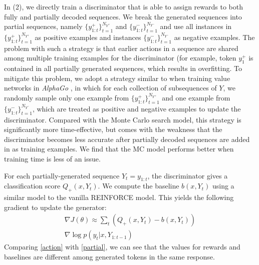 \documentclass[11pt]{article}
\begin{document}
In (2), we directly train a discriminator that is able to assign rewards to both fully and partially decoded sequences. 
We break 
the generated sequences into partial sequences, namely 
$\{y^+_{1:t}\}_{t=1}^{N_{Y^+}}$ and $\{y^-_{1:t}\}_{t=1}^{N_{Y^-}}$
 and use 
 all instances in  $\{y^+_{1:t}\}_{t=1}^{N_{Y^+}}$ as positive examples and  instances  $\{y^-_{1:t}\}_{t=1}^{N_{Y^-}}$ as negative examples. 
The problem with such a strategy is that earlier actions in a sequence are 
shared among multiple training examples for
 the discriminator 
(for example, token $y^+_1$ is contained in all partially generated sequences, which results in overfitting. 
To mitigate this problem, 
we adopt a  strategy similar to when training value networks in  {\it AlphaGo} \cite{silver2016mastering}, in which 
for each collection of subsequences of $Y$, we randomly sample only one example from $\{y^+_{1:t}\}_{t=1}^{N_{Y^+}}$ and one example from $\{y^-_{1:t}\}_{t=1}^{N_{Y^-}}$, which are treated as positive and negative examples
to update the discriminator. 
Compared with the Monte Carlo search model, this strategy is significantly more time-effective, but comes with the weakness that the discriminator becomes less accurate  after partially decoded sequences are added in as training examples. 
We find that the MC model performs better when training time is less of an issue. 


For each partially-generated sequence $Y_t=y_{1:t}$, the discriminator gives a classification score $Q_+(x,Y_t)$. 
We compute the baseline $b(x,Y_t)$
using a similar model  to the vanilla REINFORCE model. 
This yields the following gradient to update the generator:
 \begin{multline}
\nabla J(\theta)\approx \sum_t  (Q_+(x,Y_t)-b(x,Y_t))  \\
\nabla\log p(y_t|x,Y_{1:t-1})
\label{action}
\end{multline}
Comparing \eqref{action} with \eqref{partial}, we can see that
the values for  
rewards and baselines are different among generated tokens in the same response. 
\end{document}
